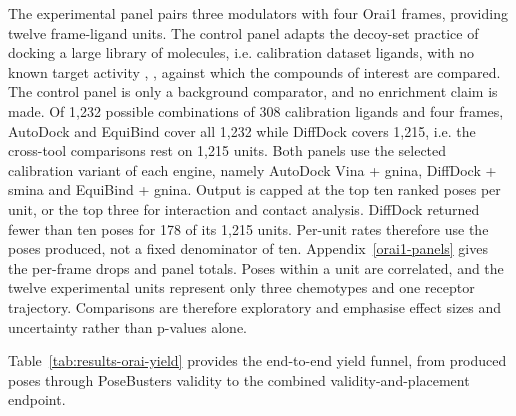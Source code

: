 The experimental panel pairs three modulators with four Orai1 frames, providing twelve frame-ligand units. The control panel adapts the decoy-set practice of docking a large library of molecules, i.e. calibration dataset ligands, with no known target activity \cite{ref045}, \cite{ref046}, against which the compounds of interest are compared. The control panel is only a background comparator, and no enrichment claim is made. Of 1,232 possible combinations of 308 calibration ligands and four frames, AutoDock and EquiBind cover all 1,232 while DiffDock covers 1,215, i.e. the cross-tool comparisons rest on 1,215 units. Both panels use the selected calibration variant of each engine, namely AutoDock Vina + gnina, DiffDock + smina and EquiBind + gnina. Output is capped at the top ten ranked poses per unit, or the top three for interaction and contact analysis. DiffDock returned fewer than ten poses for 178 of its 1,215 units. Per-unit rates therefore use the poses produced, not a fixed denominator of ten. Appendix~\ref{orai1-panels} gives the per-frame drops and panel totals. Poses within a unit are correlated, and the twelve experimental units represent only three chemotypes and one receptor trajectory. Comparisons are therefore exploratory and emphasise effect sizes and uncertainty rather than p-values alone.

Table~\ref{tab:results-orai-yield} provides the end-to-end yield funnel, from produced poses through PoseBusters validity to the combined validity-and-placement endpoint.

